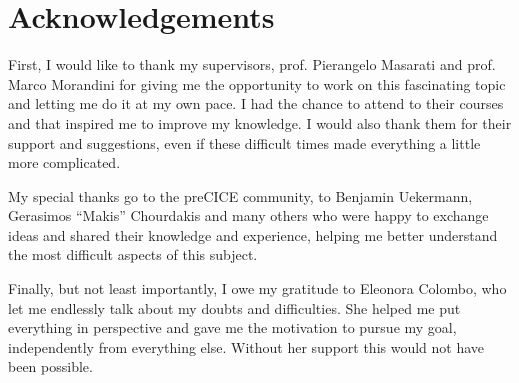\chapter*{Acknowledgements}
\label{cha:acknowledgements}

First, I would like to thank my supervisors, prof. Pierangelo Masarati and prof. Marco Morandini for giving me the opportunity to work on this fascinating topic and  letting me do it at my own pace. I had the chance to attend  to their courses and  that inspired me to improve my knowledge.
I would also thank them for their support and suggestions, even if these difficult times made everything a little more complicated. 

My special thanks go to the preCICE community, to Benjamin Uekermann, Gerasimos ``Makis'' Chourdakis and many others who were happy to exchange ideas and shared their knowledge and experience, helping me better understand the most difficult aspects of this subject.

Finally, but not least importantly, I owe my gratitude to Eleonora Colombo, who let me endlessly talk about my doubts and difficulties. She helped me put everything in perspective and gave me the motivation to pursue my goal, independently from everything else. Without her support this would not have been possible. 



